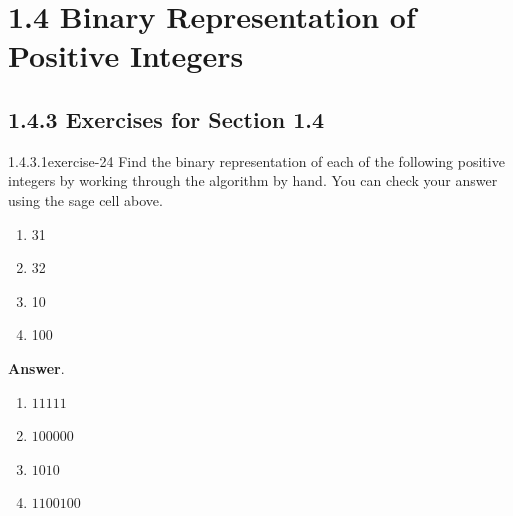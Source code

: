 \documentclass[twoside,10pt,]{book}
\numberwithin{equation}{section}
\begin{document}
\section*{1.4 Binary Representation of Positive Integers}
\subsection*{1.4.3 Exercises for Section 1.4}
\begin{divisionsolution}{1.4.3.1}{}{exercise-24}%
\hypertarget{p-428}{}%
Find the binary representation of each of the following positive integers by working through the algorithm by hand.  You can check your answer using the sage cell above.%
\par
\hypertarget{p-429}{}%
\leavevmode%
\begin{multicols}{2}
\begin{enumerate}[label=(\alph*)]
\item\hypertarget{li-314}{}\hypertarget{p-430}{}%
31%
\item\hypertarget{li-315}{}\hypertarget{p-431}{}%
32%
\item\hypertarget{li-316}{}\hypertarget{p-432}{}%
10%
\item\hypertarget{li-317}{}\hypertarget{p-433}{}%
100%
\end{enumerate}
\end{multicols}
%
\par\smallskip%
\noindent\textbf{Answer}.\quad%
\hypertarget{p-434}{}%
\leavevmode%
\begin{multicols}{2}
\begin{enumerate}[label=(\alph*)]
\item\hypertarget{li-318}{}\hypertarget{p-435}{}%
\(11111\)%
\item\hypertarget{li-319}{}\hypertarget{p-436}{}%
\(100000\)%
\item\hypertarget{li-320}{}\hypertarget{p-437}{}%
\(1010\)%
\item\hypertarget{li-321}{}\hypertarget{p-438}{}%
\(1100100\)%
\end{enumerate}
\end{multicols}
%
\end{divisionsolution}%
\end{document}
